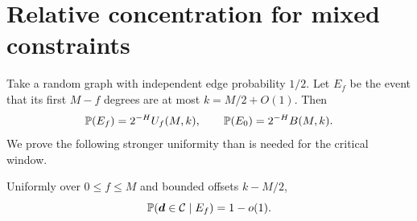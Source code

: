 \section{Relative concentration for mixed constraints}\label{ssm:sec:concentration}
Take a random graph with independent edge probability $1/2$. Let $E_f$ be the event that its first $M-f$ degrees are at most $k=M/2+O(1)$. Then
\[
 \mathbb P(E_f)=2^{-H}U_f(M,k),\qquad \mathbb P(E_0)=2^{-H}B(M,k).
\]
We prove the following stronger uniformity than is needed for the critical window.

\begin{lemma}\label{ssm:lem:relative}
Uniformly over $0\le f\le M$ and bounded offsets $k-M/2$,
\begin{equation}\label{ssm:eq:relative}
 \mathbb P(\boldsymbol d\in\mathcal C\mid E_f)=1-o(1).
\end{equation}
\end{lemma}
